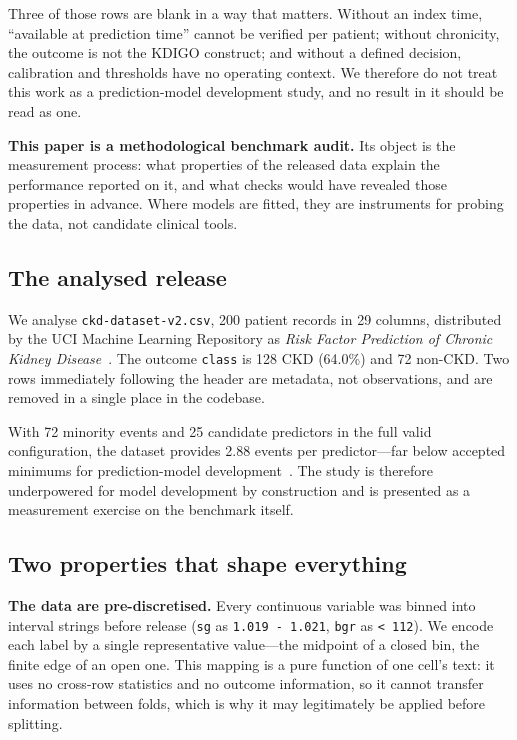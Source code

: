 \documentclass[conference]{IEEEtran}
\begin{document}
Three of those rows are blank in a way that matters. Without an index time,
``available at prediction time'' cannot be verified per patient; without
chronicity, the outcome is not the KDIGO construct; and without a defined
decision, calibration and thresholds have no operating context. We therefore
do not treat this work as a prediction-model development study, and no result
in it should be read as one.

\textbf{This paper is a methodological benchmark audit.} Its object is the
measurement process: what properties of the released data explain the
performance reported on it, and what checks would have revealed those
properties in advance. Where models are fitted, they are instruments for
probing the data, not candidate clinical tools.

\subsection{The analysed release}

We analyse \texttt{ckd-dataset-v2.csv}, 200 patient records in 29 columns,
distributed by the UCI Machine Learning Repository as \emph{Risk Factor
Prediction of Chronic Kidney Disease}~\cite{uci2023}. The outcome
\texttt{class} is 128 CKD (64.0\%) and 72 non-CKD. Two rows immediately
following the header are metadata, not observations, and are removed in a
single place in the codebase.

With 72 minority events and 25 candidate predictors in the full valid
configuration, the dataset provides 2.88 events per predictor---far below
accepted minimums for prediction-model development~\cite{riley2019}. The study
is therefore underpowered for model development by construction and is
presented as a measurement exercise on the benchmark itself.

\subsection{Two properties that shape everything}

\textbf{The data are pre-discretised.} Every continuous variable was binned
into interval strings before release (\texttt{sg} as
\texttt{1.019 - 1.021}, \texttt{bgr} as \texttt{< 112}). We encode each label
by a single representative value---the midpoint of a closed bin, the finite
edge of an open one. This mapping is a pure function of one cell's text: it
uses no cross-row statistics and no outcome information, so it cannot transfer
information between folds, which is why it may legitimately be applied before
splitting.
\end{document}
